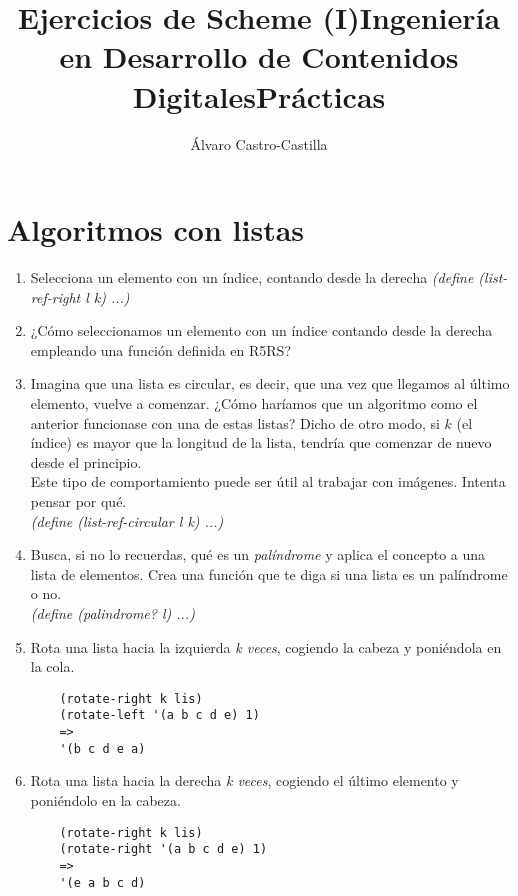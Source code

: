 \documentclass[11pt]{article}
\title{Ejercicios de Scheme (I)\linebreak Ingeniería en Desarrollo de Contenidos Digitales\linebreak Prácticas}
\author{Álvaro Castro-Castilla}
\begin{document}
\maketitle


\section{Algoritmos con listas}
\begin{enumerate}
  \item Selecciona un elemento con un índice, contando desde la derecha
    \newline \textit{(define (list-ref-right l k) ...)}

  \item ¿Cómo seleccionamos un elemento con un índice contando desde la derecha empleando una función definida en R5RS?

  \item Imagina que una lista es circular, es decir, que una vez que llegamos al último elemento, vuelve a comenzar. ¿Cómo haríamos que un algoritmo como el anterior funcionase con una de estas listas? Dicho de otro modo, si $k$ (el índice) es mayor que la longitud de la lista, tendría que comenzar de nuevo desde el principio.
    \\[3mm]
    Este tipo de comportamiento puede ser útil al trabajar con imágenes. Intenta pensar por qué.
    \\[3mm]
    \textit{(define (list-ref-circular l k) ...)}

  \item Busca, si no lo recuerdas, qué es un \textit{palíndrome} y aplica el concepto a una lista de elementos. Crea una función que te diga si una lista es un palíndrome o no.
    \\[3mm]
    \textit{(define (palindrome? l) ...)}

  \item Rota una lista hacia la izquierda \textit{k veces}, cogiendo la cabeza y poniéndola en la cola.
\begin{verbatim}
    (rotate-right k lis)
    (rotate-left '(a b c d e) 1)
    =>
    '(b c d e a)
\end{verbatim}

  \item Rota una lista hacia la derecha \textit{k veces}, cogiendo el último elemento y poniéndolo en la cabeza.
\begin{verbatim}
    (rotate-right k lis)
    (rotate-right '(a b c d e) 1)
    =>
    '(e a b c d)
\end{verbatim}


\end{enumerate}
\end{document}
